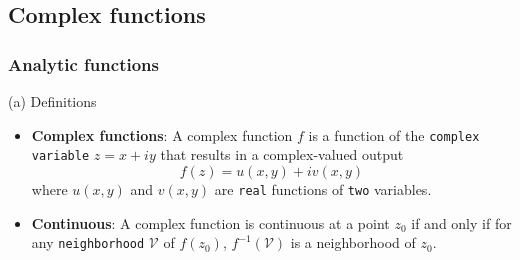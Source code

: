 \subsection{Complex functions}

\subsubsection{Analytic functions}
(a) Definitions
\begin{itemize}
	\item \textbf{Complex functions}: A complex function $f$ is a function of the \verb|complex variable| $z=x+iy$ that results in a complex-valued output
	$$
	f(z) = u(x,y) + iv(x,y)
	$$
	where $u(x,y)$ and $v(x,y) $ are \verb|real| functions of \verb|two| variables.
	\item \textbf{Continuous}: A complex function is continuous at a point $z_0$ if and only if for any \verb|neighborhood| $\mathcal{V}$ of $f(z_0)$, $f^{-1}(\mathcal{V})$ is a neighborhood of $z_0$. 
\end{itemize}